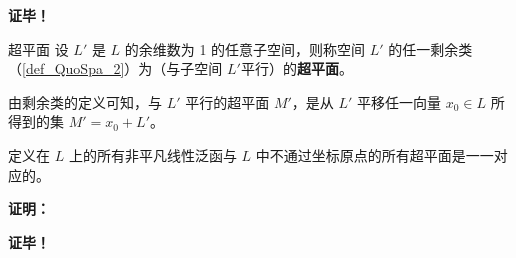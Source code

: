 \textbf{证毕！}

\begin{definition}{超平面}
设 $L'$ 是 $L$ 的余维数为 1 的任意子空间，则称空间 $L'$ 的任一剩余类（\autoref{def_QuoSpa_2}）为（与子空间 $L'$平行）的\textbf{超平面}。
\end{definition}
由剩余类的定义可知，与 $L'$ 平行的超平面 $M'$，是从 $L'$ 平移任一向量 $x_0\in L$ 所得到的集 $M'=x_0+L'$。



\begin{theorem}{}
定义在 $L$ 上的所有非平凡线性泛函与 $L$ 中不通过坐标原点的所有超平面是一一对应的。
\end{theorem}

\textbf{证明：}


\textbf{证毕！}



